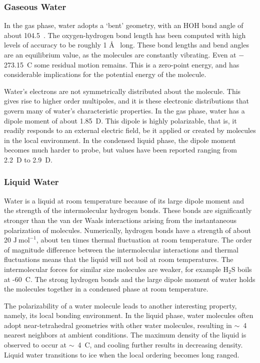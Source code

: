 \subsubsection{Gaseous Water}
In the gas phase, water adopts a `bent' geometry, with an HOH bond
angle of about 104.5\degree~. The oxygen-hydrogen bond length has been
computed with high levels of accuracy to be roughly 1 \AA~ long. These
bond lengths and bend angles are an equilibrium value, as the
molecules are constantly vibrating. Even at $-$273.15~\degree C some
residual motion remains. This is a zero-point energy,
and has considerable implications for the potential energy of the
molecule.

Water's electrons are not symmetrically distributed about the
molecule. This gives rise to higher order multipoles, and it is these
electronic distributions that govern many of water's characteristic
properties. In the gas phase, water has a dipole moment of about
1.85~D. This dipole is highly polarizable, that is, it readily
responds to an external electric field, be it applied or created by
molecules in the local environment. In the condensed liquid phase, the
dipole moment becomes much harder to probe, but values have been
reported ranging from 2.2~D to 2.9~D.


\subsubsection{Liquid Water}
Water is a liquid at room temperature because of its large dipole
moment and the strength of the intermolecular hydrogen bonds. These
bonds are significantly stronger than the van der Waals interactions
arising from the instantaneous polarization of molecules. Numerically,
hydrogen bonds have a strength of about 20
$\mathrm{J}~\mathrm{mol}^{-1}$, about ten times thermal fluctuation at
room temperature. The order of magnitude difference between the
intermolecular interactions and thermal fluctuations means that the
liquid will not boil at room temperatures. The intermolecular forces
for similar size molecules are weaker, for example
$\mathrm{H}_2\mathrm{S}$ boils at -60\degree~C. The strong hydrogen
bonds and the large dipole moment of water holds the molecules
together in a condensed phase at room temperature.

The polarizability of a water molecule leads to another interesting
property, namely, its local bonding environment. In the liquid phase,
water molecules often adopt near-tetrahedral geometries with other
water molecules, resulting in $\sim$~4 nearest neighbors at ambient
conditions. The maximum density of the liquid is observed to occur at
$\sim$~4\degree~C, and cooling further results in decreasing
density. Liquid water transitions to ice when the local ordering
becomes long ranged.


